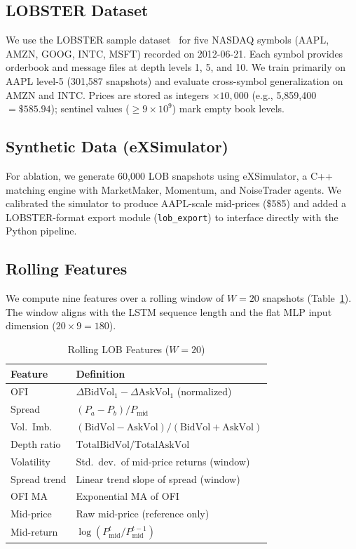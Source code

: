\documentclass[conference]{IEEEtran}
\begin{document}
\subsection{LOBSTER Dataset}
We use the LOBSTER sample dataset~\cite{lobster} for five NASDAQ symbols
(AAPL, AMZN, GOOG, INTC, MSFT) recorded on 2012-06-21.
Each symbol provides orderbook and message files at depth levels 1, 5, and 10.
We train primarily on AAPL level-5 (301,587 snapshots) and evaluate
cross-symbol generalization on AMZN and INTC.
Prices are stored as integers $\times 10{,}000$ (e.g., 5,859,400 $= \$585.94$);
sentinel values ($\geq 9 \times 10^9$) mark empty book levels.

\subsection{Synthetic Data (eXSimulator)}
For ablation, we generate 60,000 LOB snapshots using eXSimulator, a C++
matching engine with MarketMaker, Momentum, and NoiseTrader agents.
We calibrated the simulator to produce AAPL-scale mid-prices (\$585) and
added a LOBSTER-format export module (\texttt{lob\_export}) to interface
directly with the Python pipeline.

\subsection{Rolling Features}
We compute nine features over a rolling window of $W = 20$ snapshots
(Table~\ref{tab:features}). The window aligns with the LSTM sequence length
and the flat MLP input dimension ($20 \times 9 = 180$).

\begin{table}[h]
  \centering
  \caption{Rolling LOB Features ($W=20$)}
  \label{tab:features}
  \begin{tabular}{ll}
    \toprule
    Feature & Definition \\
    \midrule
    OFI        & $\Delta\text{BidVol}_1 - \Delta\text{AskVol}_1$ (normalized) \\
    Spread     & $(P_a - P_b) / P_\text{mid}$ \\
    Vol.\ Imb. & $(\text{BidVol} - \text{AskVol}) / (\text{BidVol} + \text{AskVol})$ \\
    Depth ratio & $\text{TotalBidVol} / \text{TotalAskVol}$ \\
    Volatility & Std.\ dev.\ of mid-price returns (window) \\
    Spread trend & Linear trend slope of spread (window) \\
    OFI MA     & Exponential MA of OFI \\
    Mid-price  & Raw mid-price (reference only) \\
    Mid-return & $\log(P_\text{mid}^t / P_\text{mid}^{t-1})$ \\
    \bottomrule
  \end{tabular}
\end{table}
\end{document}
